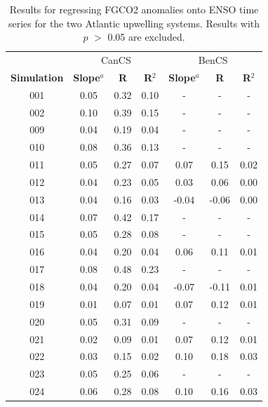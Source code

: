 \documentclass[12pt]{article}
\begin{document}
\newpage
\begin{table}[!h]
	\centering
	\caption{Results for regressing FGCO2 anomalies onto ENSO time series for the two Atlantic upwelling systems. Results with $p$ $>$ 0.05 are excluded.}
	\begin{tabular}{c c c c | c c c}
		& \multicolumn{3}{c}{CanCS} & \multicolumn{3}{c}{BenCS} \\
		\cmidrule{2-4}\cmidrule{5-7}
		\textbf{Simulation} &  \textbf{Slope}$^{a}$  &  \textbf{R} &  \textbf{R$^{2}$} &  \textbf{Slope}$^{a}$  &  \textbf{R} &  \textbf{R$^{2}$}  \\
		\midrule
		001 &   0.05 &     0.32 &       0.10 &    - &      - &        - \\
		002 &   0.10 &     0.39 &       0.15 &    - &      - &        - \\
		009 &   0.04 &     0.19 &       0.04 &    - &      - &        - \\
		010 &   0.08 &     0.36 &       0.13 &    - &      - &        - \\
		011 &   0.05 &     0.27 &       0.07 &   0.07 &     0.15 &       0.02 \\
		012 &   0.04 &     0.23 &       0.05 &   0.03 &     0.06 &       0.00 \\
		013 &   0.04 &     0.16 &       0.03 &  -0.04 &    -0.06 &       0.00 \\
		014 &   0.07 &     0.42 &       0.17 &    - &      - &        - \\
		015 &   0.05 &     0.28 &       0.08 &    - &      - &        - \\
		016 &   0.04 &     0.20 &       0.04 &   0.06 &     0.11 &       0.01 \\
		017 &   0.08 &     0.48 &       0.23 &    - &      - &        - \\
		018 &   0.04 &     0.20 &       0.04 &  -0.07 &    -0.11 &       0.01 \\
		019 &   0.01 &     0.07 &       0.01 &   0.07 &     0.12 &       0.01 \\
		020 &   0.05 &     0.31 &       0.09 &    - &      - &        - \\
		021 &   0.02 &     0.09 &       0.01 &   0.07 &     0.12 &       0.01 \\
		022 &   0.03 &     0.15 &       0.02 &   0.10 &     0.18 &       0.03 \\
		023 &   0.05 &     0.25 &       0.06 &    - &      - &        - \\
		024 &   0.06 &     0.28 &       0.08 &   0.10 &     0.16 &       0.03 \\

\end{tabular}
\end{table}
\end{document}
